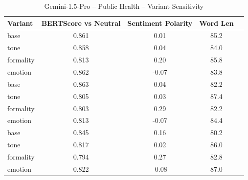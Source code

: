 \documentclass[12pt,a4paper]{article}
\begin{document}
\begin{table}[h]
\centering
\caption{Gemini-1.5-Pro – Public Health – Variant Sensitivity}
\label{tab:Gemini-1.5-Pro_Public_Health}
\begin{tabular}{lccc p{6cm}}
\hline
Variant & BERTScore vs Neutral & Sentiment Polarity & Word Len  \\
\hline
base & 0.861 & 0.01 & 85.2  \\
tone & 0.858 & 0.04 & 84.0  \\
formality & 0.813 & 0.20 & 85.8  \\
emotion & 0.862 & -0.07 & 83.8  \\
base & 0.863 & 0.04 & 82.2  \\
tone & 0.805 & 0.03 & 87.4  \\
formality & 0.803 & 0.29 & 82.2  \\
emotion & 0.813 & -0.07 & 84.4  \\
base & 0.845 & 0.16 & 80.2  \\
tone & 0.817 & 0.02 & 86.0  \\
formality & 0.794 & 0.27 & 82.8  \\
emotion & 0.822 & -0.08 & 87.0  \\
\hline
\end{tabular}
\end{table}
\end{document}

